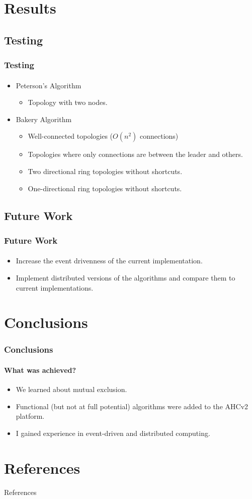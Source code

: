 \documentclass[11pt]{beamer}              %
\begin{document}
\section{Results}

\subsection{Testing}
\begin{frame}
\frametitle{Testing}
\framesubtitle{}
\begin{itemize}
	\item Peterson's Algorithm
		\begin{itemize}
			 \item Topology with two nodes.
		\end{itemize}
	\item Bakery Algorithm
		\begin{itemize}
			\item Well-connected topologies ($O(n^2)$ connections)
			\item Topologies where only connections are between the leader and others.
			\item Two directional ring topologies without shortcuts.
			\item One-directional ring topologies without shortcuts.
		\end{itemize}
\end{itemize}
\end{frame}

\subsection{Future Work}
\begin{frame}
\frametitle{Future Work}
\framesubtitle{}

\begin{itemize}
	\item Increase the event drivenness of the current implementation.
	\item Implement distributed versions of the algorithms and compare them to current implementations.
\end{itemize}

\end{frame}

\section{Conclusions}
\begin{frame}
\frametitle{Conclusions}
\framesubtitle{What was achieved?}
\begin{itemize}
	\item We learned about mutual exclusion.
	\item Functional (but not at full potential) algorithms were added to the AHCv2 platform.
	\item I gained experience in event-driven and distributed computing.
\end{itemize}
	
\end{frame}

\section*{References}
\begin{frame}{References}
\tiny


\end{frame}

\thankslide
\end{document}
